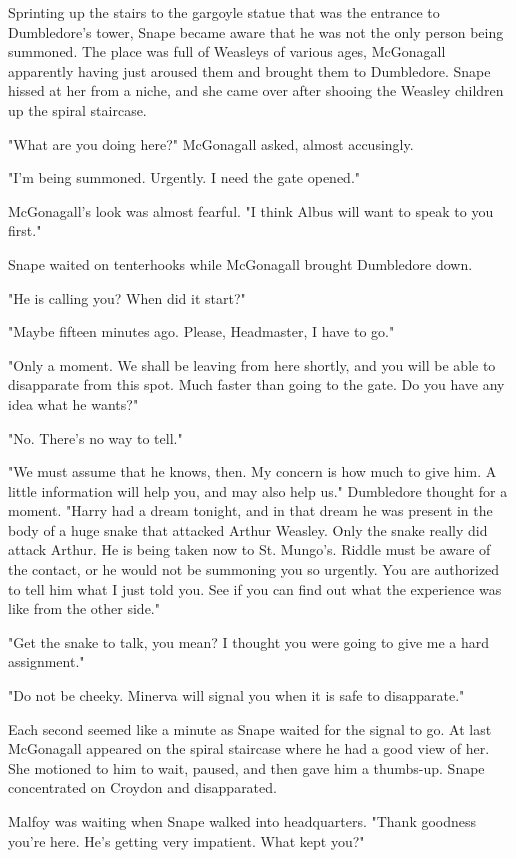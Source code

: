 \documentclass[a4paper,11pt]{article}
\begin{document}
Sprinting up the stairs to the gargoyle statue that was the entrance to Dumbledore's tower, Snape became aware that he was not the only person being summoned. The place was full of Weasleys of various ages, McGonagall apparently having just aroused them and brought them to Dumbledore. Snape hissed at her from a niche, and she came over after shooing the Weasley children up the spiral staircase.

"What are you doing here?" McGonagall asked, almost accusingly.

"I'm being summoned. Urgently. I need the gate opened."

McGonagall's look was almost fearful. "I think Albus will want to speak to you first."

Snape waited on tenterhooks while McGonagall brought Dumbledore down.

"He is calling you? When did it start?"

"Maybe fifteen minutes ago. Please, Headmaster, I have to go."

"Only a moment. We shall be leaving from here shortly, and you will be able to disapparate from this spot. Much faster than going to the gate. Do you have any idea what he wants?"

"No. There's no way to tell."

"We must assume that he knows, then. My concern is how much to give him. A little information will help you, and may also help us." Dumbledore thought for a moment. "Harry had a dream tonight, and in that dream he was present in the body of a huge snake that attacked Arthur Weasley. Only the snake really did attack Arthur. He is being taken now to St. Mungo's. Riddle must be aware of the contact, or he would not be summoning you so urgently. You are authorized to tell him what I just told you. See if you can find out what the experience was like from the other side."

"Get the snake to talk, you mean? I thought you were going to give me a hard assignment."

"Do not be cheeky. Minerva will signal you when it is safe to disapparate."

Each second seemed like a minute as Snape waited for the signal to go. At last McGonagall appeared on the spiral staircase where he had a good view of her. She motioned to him to wait, paused, and then gave him a thumbs-up. Snape concentrated on Croydon and disapparated.

Malfoy was waiting when Snape walked into headquarters. "Thank goodness you're here. He's getting very impatient. What kept you?"
\end{document}
